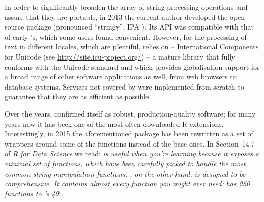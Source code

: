 \documentclass[nojss]{jss}\usepackage[]{graphicx}\usepackage[]{color}
\begin{document}

In order to significantly broaden the array of string processing
operations and assure that they are portable,
in 2013 the current author developed
the open source  package (pronounced ``stringy'', IPA \textipa{[{stringi}]}).
Its API was compatible with that of early 's,
which some users found convenient.
However, for the processing of text in different locales,
which are plentiful,  relies
on  -- International Components for Unicode
(see \url{http://site.icu-project.org/}) --
a mature library that fully conforms with
the Unicode standard and which provides globalisation support for
a broad range of other software applications as well, from
web browsers to database systems.
Services not covered by  were implemented from scratch to
guarantee that they are as efficient as possible.

Over the years,  confirmed itself as robust,
production-quality software; for many years now it has been one of the
most often downloaded R extensions. Interestingly, in 2015 the
aforementioned  package has been rewritten as a
set of wrappers around some of the  functions instead of
the base  ones.
In Section~14.7 of \textit{R for Data Science} \citep{GrolemundWickham2017:rdatascience}
we read: \textit{ is useful when you're learning because
it exposes a minimal set of functions, which have been carefully picked
to handle the most common string manipulation functions. ,
on the other hand, is designed to be comprehensive. It contains almost
every function you might ever need:  has 250 functions to
's 49}.
\end{document}
